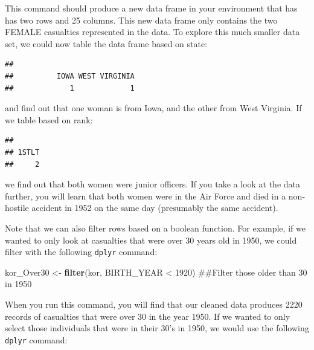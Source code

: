 \documentclass[]{book}
\newenvironment{Shaded}{\begin{snugshade}}{\end{snugshade}}
\newcommand{\KeywordTok}[1]{\textcolor[rgb]{0.13,0.29,0.53}{\textbf{{#1}}}}
\newcommand{\DecValTok}[1]{\textcolor[rgb]{0.00,0.00,0.81}{{#1}}}
\newcommand{\StringTok}[1]{\textcolor[rgb]{0.31,0.60,0.02}{{#1}}}
\newcommand{\NormalTok}[1]{{#1}}
\begin{document}
This command should produce a new data frame in your environment that
has has two rows and 25 columns. This new data frame only contains the
two FEMALE casualties represented in the data. To explore this much
smaller data set, we could now table the data frame based on state:

\begin{Shaded}
\end{Shaded}

\begin{verbatim}
## 
##          IOWA WEST VIRGINIA 
##             1             1
\end{verbatim}

and find out that one woman is from Iowa, and the other from West
Virginia. If we table based on rank:

\begin{Shaded}
\end{Shaded}

\begin{verbatim}
## 
## 1STLT 
##     2
\end{verbatim}

we find out that both women were junior officers. If you take a look at
the data further, you will learn that both women were in the Air Force
and died in a non-hostile accident in 1952 on the same day (presumably
the same accident).

Note that we can also filter rows based on a boolean function. For
example, if we wanted to only look at casualties that were over 30 years
old in 1950, we could filter with the following \texttt{dplyr} command:

\begin{Shaded}
\begin{Highlighting}[]
\NormalTok{kor_Over30 <-}\StringTok{ }\KeywordTok{filter}\NormalTok{(kor, BIRTH_YEAR <}\StringTok{ }\DecValTok{1920}\NormalTok{)  ##Filter those older than 30 in 1950}
\end{Highlighting}
\end{Shaded}

When you run this command, you will find that our cleaned data produces
2220 records of casualties that were over 30 in the year 1950. If we
wanted to only select those individuals that were in their 30's in 1950,
we would use the following \texttt{dplyr} command:
\end{document}
